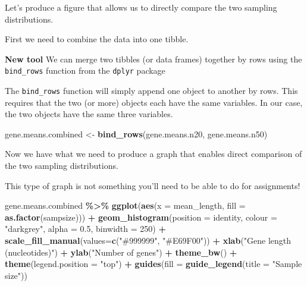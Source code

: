 \documentclass[
]{book}
\newenvironment{Shaded}{\begin{snugshade}}{\end{snugshade}}
\newcommand{\AttributeTok}[1]{\textcolor[rgb]{0.13,0.29,0.53}{#1}}
\newcommand{\DecValTok}[1]{\textcolor[rgb]{0.00,0.00,0.81}{#1}}
\newcommand{\FloatTok}[1]{\textcolor[rgb]{0.00,0.00,0.81}{#1}}
\newcommand{\FunctionTok}[1]{\textcolor[rgb]{0.13,0.29,0.53}{\textbf{#1}}}
\newcommand{\NormalTok}[1]{#1}
\newcommand{\OtherTok}[1]{\textcolor[rgb]{0.56,0.35,0.01}{#1}}
\newcommand{\SpecialCharTok}[1]{\textcolor[rgb]{0.81,0.36,0.00}{\textbf{#1}}}
\newcommand{\StringTok}[1]{\textcolor[rgb]{0.31,0.60,0.02}{#1}}
\begin{document}
Let's produce a figure that allows us to directly compare the two sampling distributions.

First we need to combine the data into one tibble.

\textbf{New tool}
We can merge two tibbles (or data frames) together by rows using the \texttt{bind\_rows} function from the \texttt{dplyr} package

The \texttt{bind\_rows} function will simply append one object to another by rows. This requires that the two (or more) objects each have the same variables. In our case, the two objects have the same three variables.

\begin{Shaded}
\begin{Highlighting}[]
\NormalTok{gene.means.combined }\OtherTok{\textless{}{-}} \FunctionTok{bind\_rows}\NormalTok{(gene.means.n20, gene.means.n50)}
\end{Highlighting}
\end{Shaded}

Now we have what we need to produce a graph that enables direct comparison of the two sampling distributions.

This type of graph is not something you'll need to be able to do for assignments!

\begin{Shaded}
\begin{Highlighting}[]
\NormalTok{gene.means.combined }\SpecialCharTok{\%\textgreater{}\%}
 \FunctionTok{ggplot}\NormalTok{(}\FunctionTok{aes}\NormalTok{(}\AttributeTok{x =}\NormalTok{ mean\_length, }\AttributeTok{fill =} \FunctionTok{as.factor}\NormalTok{(sampsize))) }\SpecialCharTok{+}
  \FunctionTok{geom\_histogram}\NormalTok{(}\AttributeTok{position =} \StringTok{\textquotesingle{}identity\textquotesingle{}}\NormalTok{, }\AttributeTok{colour =} \StringTok{"darkgrey"}\NormalTok{, }\AttributeTok{alpha =} \FloatTok{0.5}\NormalTok{, }\AttributeTok{binwidth =} \DecValTok{250}\NormalTok{) }\SpecialCharTok{+}
  \FunctionTok{scale\_fill\_manual}\NormalTok{(}\AttributeTok{values=}\FunctionTok{c}\NormalTok{(}\StringTok{"\#999999"}\NormalTok{, }\StringTok{"\#E69F00"}\NormalTok{)) }\SpecialCharTok{+}
  \FunctionTok{xlab}\NormalTok{(}\StringTok{"Gene length (nucleotides)"}\NormalTok{) }\SpecialCharTok{+}
  \FunctionTok{ylab}\NormalTok{(}\StringTok{"Number of genes"}\NormalTok{) }\SpecialCharTok{+}
  \FunctionTok{theme\_bw}\NormalTok{() }\SpecialCharTok{+}
  \FunctionTok{theme}\NormalTok{(}\AttributeTok{legend.position =} \StringTok{"top"}\NormalTok{) }\SpecialCharTok{+}
  \FunctionTok{guides}\NormalTok{(}\AttributeTok{fill =} \FunctionTok{guide\_legend}\NormalTok{(}\AttributeTok{title =} \StringTok{"Sample size"}\NormalTok{))}
\end{Highlighting}
\end{Shaded}
\end{document}
